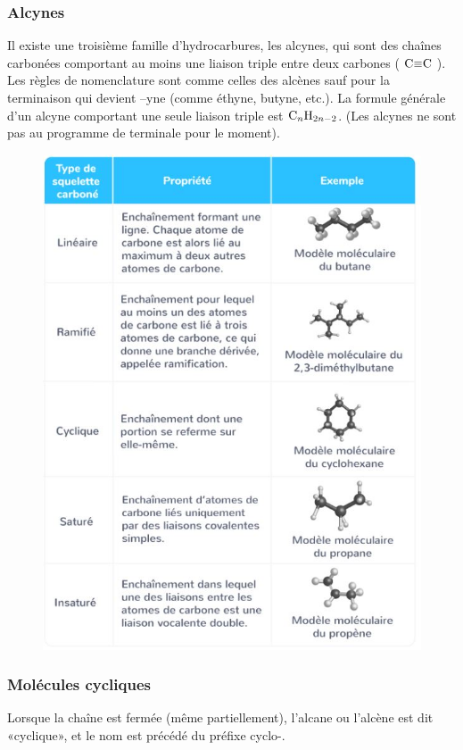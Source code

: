 \documentclass[11pt,a4paper]{article}
\begin{document}
\subsubsection{Alcynes}
Il existe une troisième famille d’hydrocarbures, les alcynes, qui sont des chaînes carbonées comportant au moins une liaison triple entre deux carbones ( $\ce{C#C}$ ). Les règles de nomenclature sont comme celles des alcènes sauf pour la terminaison qui devient –yne (comme éthyne, butyne, etc.).  La formule générale d’un alcyne comportant une seule liaison triple est $\ce{C_nH_{2n-2}}$. (Les alcynes ne sont pas au programme de terminale pour le moment). 
\vspace{1.5cm}
\begin{figure}[H]
    \centering
    \includegraphics[width=0.75\linewidth]{imgs/c5/structures.jpg}
\end{figure}

\subsubsection{Molécules cycliques}
Lorsque la chaîne est fermée (même partiellement), l’alcane ou l’alcène est dit «cyclique», et le nom est précédé du préfixe cyclo-. 
\end{document}
